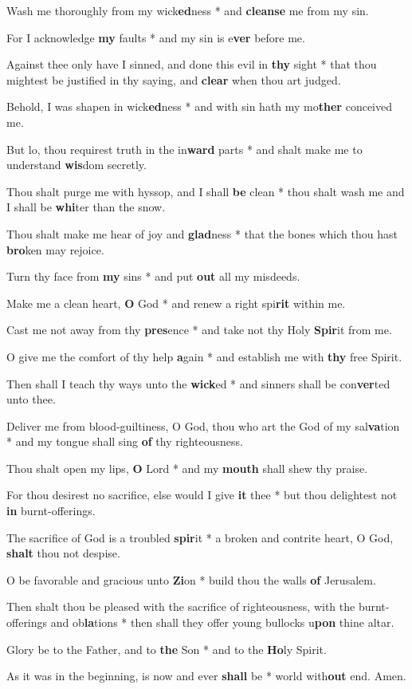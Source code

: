 \begin{multicols}{2}
	Wash me thoroughly from my wick\textbf{ed}ness * and \textbf{cleanse} me from my sin.
	
	For I acknowledge \textbf{my} faults * and my sin is e\textbf{ver} before me.
	
	Against thee only have I sinned, and done this evil in \textbf{thy} sight * that thou mightest be justified in thy saying, and \textbf{clear} when thou art judged.
	
	Behold, I was shapen in wick\textbf{ed}ness * and with sin hath my mo\textbf{ther} conceived me.
	
	But lo, thou requirest truth in the in\textbf{ward} parts * and shalt make me to understand \textbf{wis}dom secretly.
	
	Thou shalt purge me with hyssop, and I shall \textbf{be} clean * thou shalt wash me and I shall be \textbf{whi}ter than the snow.
	
	Thou shalt make me hear of joy and \textbf{glad}ness * that the bones which thou hast \textbf{bro}ken may rejoice.
	
	Turn thy face from \textbf{my} sins * and put \textbf{out} all my misdeeds.
	
	Make me a clean heart, \textbf{O} God * and renew a right spi\textbf{rit} within me.
	
	Cast me not away from thy \textbf{pres}ence * and take not thy Holy \textbf{Spir}it from me.
	
	O give me the comfort of thy help \textbf{a}gain * and establish me with \textbf{thy} free Spirit.
	
	Then shall I teach thy ways unto the \textbf{wick}ed * and sinners shall be con\textbf{ver}ted unto thee.
	
	Deliver me from blood-guiltiness, O God, thou who art the God of my sal\textbf{va}tion * and my tongue shall sing \textbf{of} thy righteousness.
	
	Thou shalt open my lips, \textbf{O} Lord * and my \textbf{mouth} shall shew thy praise.
	
	For thou desirest no sacrifice, else would I give \textbf{it} thee * but thou delightest not \textbf{in} burnt-offerings.
	
	The sacrifice of God is a troubled \textbf{spir}it * a broken and contrite heart, O God, \textbf{shalt} thou not despise.
	
	O be favorable and gracious unto \textbf{Zi}on * build thou the walls \textbf{of} Jerusalem.
	
	Then shalt thou be pleased with the sacrifice of righteousness, with the burnt-offerings and ob\textbf{la}tions * then shall they offer young bullocks u\textbf{pon} thine altar.
	
	Glory be to the Father, and to \textbf{the} Son * and to the \textbf{Ho}ly Spirit.
	
	As it was in the beginning, is now and ever \textbf{shall} be * world with\textbf{out} end. Amen.
\end{multicols}